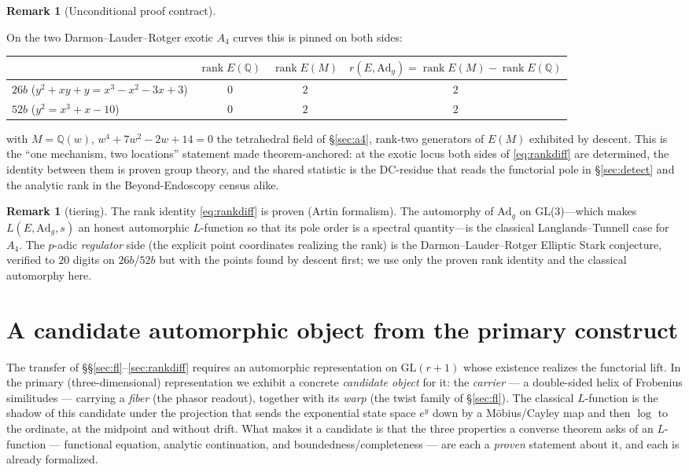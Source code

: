 \documentclass[11pt]{article}
\theoremstyle{definition}
\newtheorem{remark}[theorem]{Remark}
\begin{document}
\begin{remark}[Unconditional proof contract]
\begin{enumerate}
On the two Darmon--Lauder--Rotger exotic $A_4$ curves this is pinned on both sides:
\begin{center}
\begin{tabular}{lccc}
\toprule
 & $\operatorname{rank}E(\mathbb Q)$ & $\operatorname{rank}E(M)$ & $r(E,\mathrm{Ad}_g)=\operatorname{rank}E(M)-\operatorname{rank}E(\mathbb Q)$ \\
\midrule
$26b$ ($y^2+xy+y=x^3-x^2-3x+3$) & $0$ & $2$ & $2$ \\
$52b$ ($y^2=x^3+x-10$) & $0$ & $2$ & $2$ \\
\bottomrule
\end{tabular}
\end{center}
with $M=\mathbb Q(w)$, $w^4+7w^2-2w+14=0$ the tetrahedral field of \S\ref{sec:a4}, rank-two
generators of $E(M)$ exhibited by descent. This is the ``one mechanism, two locations'' statement
made theorem-anchored: at the exotic locus both sides of \eqref{eq:rankdiff} are determined, the
identity between them is proven group theory, and the shared statistic is the DC-residue that reads
the functorial pole in \S\ref{sec:detect} and the analytic rank in the Beyond-Endoscopy census
alike.

\begin{remark}[tiering]
The rank identity \eqref{eq:rankdiff} is proven (Artin formalism). The automorphy of $\mathrm{Ad}_g$
on GL(3)---which makes $L(E,\mathrm{Ad}_g,s)$ an honest automorphic $L$-function so that its pole order
is a spectral quantity---is the classical Langlands--Tunnell case for $A_4$. The $p$-adic
\emph{regulator} side (the explicit point coordinates realizing the rank) is the Darmon--Lauder--Rotger
Elliptic Stark conjecture, verified to $20$ digits on $26b$/$52b$ but with the points found by
descent first; we use only the proven rank identity and the classical automorphy here.
\end{remark}

\section{A candidate automorphic object from the primary construct}\label{sec:construct}

The transfer of \S\S\ref{sec:fl}--\ref{sec:rankdiff} requires an automorphic representation on
$\mathrm{GL}(r+1)$ whose existence realizes the functorial lift. In the primary (three-dimensional)
representation we exhibit a concrete \emph{candidate object} for it: the \emph{carrier} --- a
double-sided helix of Frobenius similitudes --- carrying a \emph{fiber} (the phasor readout), together
with its \emph{warp} (the twist family of \S\ref{sec:fl}). The classical $L$-function is the shadow of
this candidate under the projection that sends the exponential state space $e^{y}$ down by a
M\"obius/Cayley map and then $\log$ to the ordinate, at the midpoint and without drift. What makes it
a candidate is that the three properties a converse theorem asks of an $L$-function --- functional
equation, analytic continuation, and boundedness/completeness --- are each a \emph{proven} statement
about it, and each is already formalized.


\end{enumerate}
\end{remark}
\end{document}
